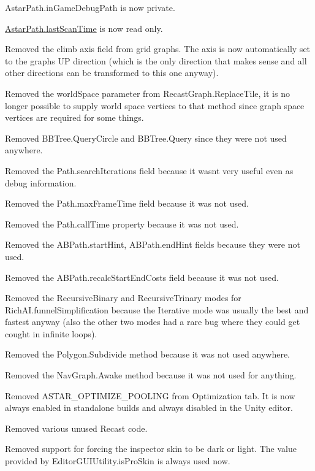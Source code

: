 \begin{DoxyItemize}
\begin{DoxyItemize}
\begin{DoxyItemize}
\item Astar\+Path.\+in\+Game\+Debug\+Path is now private.
\item \mbox{\hyperlink{class_astar_path_aae68bf9b08ca59b4007a1fde94c28ca0}{Astar\+Path.\+last\+Scan\+Time}} is now read only.
\item Removed the \textquotesingle{}climb axis\textquotesingle{} field from grid graphs. The axis is now automatically set to the graph\textquotesingle{}s UP direction (which is the only direction that makes sense and all other directions can be transformed to this one anyway).
\item Removed the \textquotesingle{}world\+Space\textquotesingle{} parameter from Recast\+Graph.\+Replace\+Tile, it is no longer possible to supply world space vertices to that method since graph space vertices are required for some things.
\item Removed B\+B\+Tree.\+Query\+Circle and B\+B\+Tree.\+Query since they were not used anywhere.
\item Removed the Path.\+search\+Iterations field because it wasn\textquotesingle{}t very useful even as debug information.
\item Removed the Path.\+max\+Frame\+Time field because it was not used.
\item Removed the Path.\+call\+Time property because it was not used.
\item Removed the A\+B\+Path.\+start\+Hint, A\+B\+Path.\+end\+Hint fields because they were not used.
\item Removed the A\+B\+Path.\+recalc\+Start\+End\+Costs field because it was not used.
\item Removed the Recursive\+Binary and Recursive\+Trinary modes for Rich\+A\+I.\+funnel\+Simplification because the Iterative mode was usually the best and fastest anyway (also the other two modes had a rare bug where they could get cought in infinite loops).
\item Removed the Polygon.\+Subdivide method because it was not used anywhere.
\item Removed the Nav\+Graph.\+Awake method because it was not used for anything.
\item Removed A\+S\+T\+A\+R\+\_\+\+O\+P\+T\+I\+M\+I\+Z\+E\+\_\+\+P\+O\+O\+L\+I\+NG from Optimization tab. It is now always enabled in standalone builds and always disabled in the Unity editor.
\item Removed various unused Recast code.
\item Removed support for forcing the inspector skin to be dark or light. The value provided by Editor\+G\+U\+I\+Utility.\+is\+Pro\+Skin is always used now.

\end{DoxyItemize}
\end{DoxyItemize}
\end{DoxyItemize}
